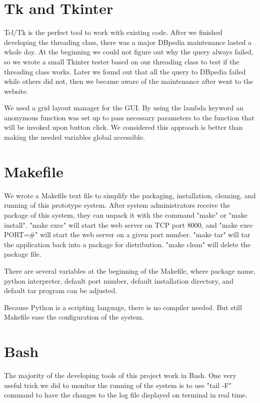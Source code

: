 \documentclass[12pt]{cls}
\begin{document}
\section{Tk and Tkinter}

Tcl/Tk is the perfect tool to work with existing code. After we finished developing the threading class, there was a major DBpedia maintenance lasted a whole day. At the beginning we could not figure out why the query always failed, so we wrote a small Tkinter tester based on our threading class to test if the threading class works. Later we found out that all the query to DBpedia failed while others did not, then we became aware of the maintenance after went to the website.

We used a grid layout manager for the GUI. By using the lambda keyword an anonymous function was set up to pass necessary parameters to the function that will be invoked upon button click. We considered this approach is better than making the needed variables global accessible.

\section{Makefile}

We wrote a Makefile text file to simplify the packaging, installation, cleaning, and running of this prototype system. After system administrators receive the package of this system, they can unpack it with the command "make" or "make install". "make exec" will start the web server on TCP port 8000, and "make exec PORT=\#" will start the web server on a given port number. "make tar" will tar the application back into a package for distribution. "make clean" will delete the package file.

There are several variables at the beginning of the Makefile, where package name, python interpreter, default port number, default installation directory, and default tar program can be adjusted.

Because Python is a scripting language, there is no compiler needed. But still Makefile ease the configuration of the system.

\section{Bash}

The majority of the developing tools of this project work in Bash. One very useful trick we did to monitor the running of the system is to use "tail -F" command to have the changes to the log file displayed on terminal in real time.
\end{document}
